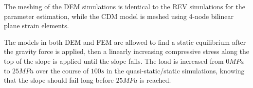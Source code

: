 The meshing of the DEM simulations is identical to the REV simulations for the parameter estimation, while the CDM model is meshed using 4-node bilinear plane strain elements.

The models in both DEM and FEM are allowed to find a static equilibrium after the gravity force is applied, then a linearly increasing compressive stress along the top of the slope is applied until the slope fails. The load is increased from $0MPa$ to $25 MPa$ over the course of $100s$ in the quasi-static/static simulations, knowing that the slope should fail long before $25MPa$ is reached.